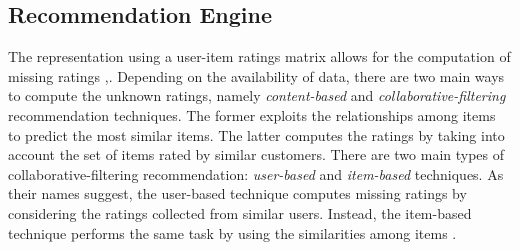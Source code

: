 

\subsection{Recommendation Engine} \label{sec:RecommendationEngine}
The representation using a user-item ratings matrix allows for the computation of missing ratings \cite{Aggarwal2016},\cite{DBLP:conf/rweb/NoiaO15}. Depending on the availability of data, there are two main ways to compute the unknown ratings, namely \emph{content-based} \cite{Pazzani2007} and \emph{collaborative-filtering} \cite{Miranda:2008:ICF:1486927.1487083} recommendation techniques. The former exploits the relationships among items to predict the most similar items. The latter computes the ratings by taking into account the set of items rated by similar customers. There are two main types of collaborative-filtering recommendation: \emph{user-based} \cite{Zhao:2010:UCR:1748610.1749278} and \emph{item-based} \cite{Sarwar:2001:ICF:371920.372071} techniques. As their names suggest, the user-based technique computes missing ratings by considering the ratings collected from similar users. Instead, the item-based technique performs the same task by using the similarities among items \cite{Cremonesi:2008:EMC:1468165.1468327}.

